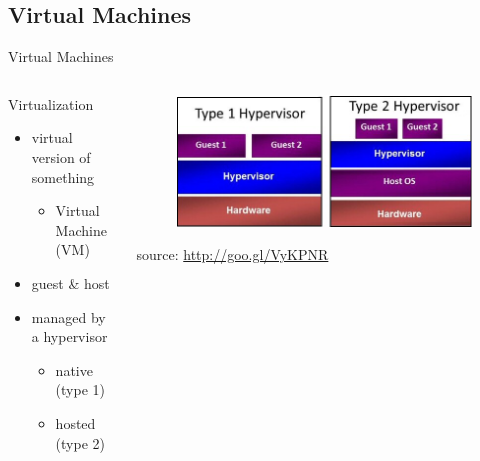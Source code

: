 \subsection{Virtual Machines}
\begin{frame}{Virtual Machines}
	\begin{columns}
		\begin{column}{0.5\textwidth}
			Virtualization
			\begin{itemize}
				\item{\footnotesize{virtual version of something}}
				\begin{itemize}
					\item{Virtual Machine (VM)}
				\end{itemize}
				\item{\footnotesize{guest \& host}}
				\item{\footnotesize{managed by a hypervisor}}
				\begin{itemize}
					\item{\scriptsize{native (type 1)}}
					\item{\scriptsize{hosted (type 2)}}
				\end{itemize}
			\end{itemize}
		\end{column}
		\begin{column}{0.5\textwidth}
			\begin{figure}
				\centering{}
				\includegraphics[scale=0.25]{images/virtualization-types.png}
			\end{figure}
			\begin{flushright}
				\tiny{source: \url{http://goo.gl/VyKPNR}}
			\end{flushright}
		\end{column}
	\end{columns}
\end{frame}

